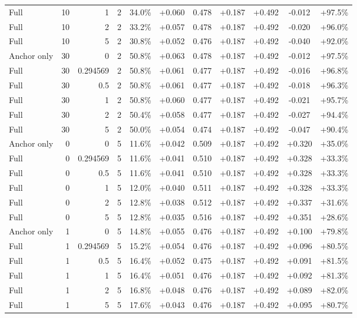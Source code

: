 \begin{table}[htbp]
\begin{tabular}{lrrrccccccc}
Full & 10 & 1 & 2 & 34.0\% & +0.060 & 0.478 & +0.187 & +0.492 & -0.012 & +97.5\% \\
Full & 10 & 2 & 2 & 33.2\% & +0.057 & 0.478 & +0.187 & +0.492 & -0.020 & +96.0\% \\
Full & 10 & 5 & 2 & 30.8\% & +0.052 & 0.476 & +0.187 & +0.492 & -0.040 & +92.0\% \\
Anchor only & 30 & 0 & 2 & 50.8\% & +0.063 & 0.478 & +0.187 & +0.492 & -0.012 & +97.5\% \\
Full & 30 & 0.294569 & 2 & 50.8\% & +0.061 & 0.477 & +0.187 & +0.492 & -0.016 & +96.8\% \\
Full & 30 & 0.5 & 2 & 50.8\% & +0.061 & 0.477 & +0.187 & +0.492 & -0.018 & +96.3\% \\
Full & 30 & 1 & 2 & 50.8\% & +0.060 & 0.477 & +0.187 & +0.492 & -0.021 & +95.7\% \\
Full & 30 & 2 & 2 & 50.4\% & +0.058 & 0.477 & +0.187 & +0.492 & -0.027 & +94.4\% \\
Full & 30 & 5 & 2 & 50.0\% & +0.054 & 0.474 & +0.187 & +0.492 & -0.047 & +90.4\% \\
Anchor only & 0 & 0 & 5 & 11.6\% & +0.042 & 0.509 & +0.187 & +0.492 & +0.320 & +35.0\% \\
Full & 0 & 0.294569 & 5 & 11.6\% & +0.041 & 0.510 & +0.187 & +0.492 & +0.328 & +33.3\% \\
Full & 0 & 0.5 & 5 & 11.6\% & +0.041 & 0.510 & +0.187 & +0.492 & +0.328 & +33.3\% \\
Full & 0 & 1 & 5 & 12.0\% & +0.040 & 0.511 & +0.187 & +0.492 & +0.328 & +33.3\% \\
Full & 0 & 2 & 5 & 12.8\% & +0.038 & 0.512 & +0.187 & +0.492 & +0.337 & +31.6\% \\
Full & 0 & 5 & 5 & 12.8\% & +0.035 & 0.516 & +0.187 & +0.492 & +0.351 & +28.6\% \\
Anchor only & 1 & 0 & 5 & 14.8\% & +0.055 & 0.476 & +0.187 & +0.492 & +0.100 & +79.8\% \\
Full & 1 & 0.294569 & 5 & 15.2\% & +0.054 & 0.476 & +0.187 & +0.492 & +0.096 & +80.5\% \\
Full & 1 & 0.5 & 5 & 16.4\% & +0.052 & 0.475 & +0.187 & +0.492 & +0.091 & +81.5\% \\
Full & 1 & 1 & 5 & 16.4\% & +0.051 & 0.476 & +0.187 & +0.492 & +0.092 & +81.3\% \\
Full & 1 & 2 & 5 & 16.8\% & +0.048 & 0.476 & +0.187 & +0.492 & +0.089 & +82.0\% \\
Full & 1 & 5 & 5 & 17.6\% & +0.043 & 0.476 & +0.187 & +0.492 & +0.095 & +80.7\% \\

\end{tabular}
\end{table}
